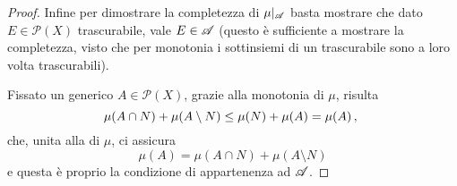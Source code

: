 \begin{proof}
	Infine per dimostrare la completezza di $\mu|_{\mathscr A}$ basta mostrare che dato $E\in\mathcal P(X)$ trascurabile, vale $E\in\mathscr A$ (questo è sufficiente a mostrare la completezza, visto che per monotonia i sottinsiemi di un trascurabile sono a loro volta trascurabili).
	
	Fissato un generico $A\in\mathcal P(X)$, grazie alla monotonia di $\mu$, risulta
	\begin{equation*}
		\mu(A\cap N)+\mu(A\setminus N)\le \mu(N)+\mu(A)=\mu(A)\, \text{, }
	\end{equation*}
	che, unita alla \sigsubadd[ità] di $\mu$, ci assicura
	\begin{equation*}
		\mu(A)=\mu(A\cap N)+\mu(A\setminus N)
	\end{equation*}
	e questa è proprio la condizione di appartenenza ad $\mathscr A$.
\end{proof}

